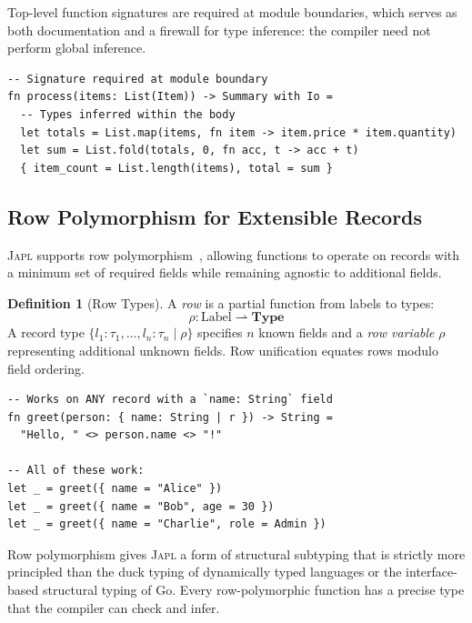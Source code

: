 \documentclass[11pt]{article}
\theoremstyle{definition}
\newtheorem{definition}[theorem]{Definition}
\theoremstyle{remark}
\newcommand{\Type}{\mathbf{Type}}
\newcommand{\japl}{\textsc{Japl}}
\begin{document}
Top-level function signatures are required at module boundaries, which
serves as both documentation and a firewall for type inference: the
compiler need not perform global inference.

\begin{lstlisting}[caption={Type inference in practice.}]
-- Signature required at module boundary
fn process(items: List(Item)) -> Summary with Io =
  -- Types inferred within the body
  let totals = List.map(items, fn item -> item.price * item.quantity)
  let sum = List.fold(totals, 0, fn acc, t -> acc + t)
  { item_count = List.length(items), total = sum }
\end{lstlisting}

\subsection{Row Polymorphism for Extensible Records}
\label{sec:type-system:row}

\japl{} supports row polymorphism~\cite{wand1991type,remy1994type},
allowing functions to operate on records with a minimum set of required
fields while remaining agnostic to additional fields.

\begin{definition}[Row Types]
\label{def:row-types}
A \emph{row} is a partial function from labels to types:
\[
  \rho : \mathrm{Label} \rightharpoonup \Type
\]
A record type $\{l_1:\tau_1, \ldots, l_n:\tau_n \mid \rho\}$ specifies
$n$ known fields and a \emph{row variable} $\rho$ representing
additional unknown fields.  Row unification equates rows modulo field
ordering.
\end{definition}

\begin{lstlisting}[caption={Row polymorphism in \japl{}.}]
-- Works on ANY record with a `name: String` field
fn greet(person: { name: String | r }) -> String =
  "Hello, " <> person.name <> "!"

-- All of these work:
let _ = greet({ name = "Alice" })
let _ = greet({ name = "Bob", age = 30 })
let _ = greet({ name = "Charlie", role = Admin })
\end{lstlisting}

Row polymorphism gives \japl{} a form of structural subtyping that is
strictly more principled than the duck typing of dynamically typed
languages or the interface-based structural typing of Go.  Every row-polymorphic
function has a precise type that the compiler can check and infer.
\end{document}
